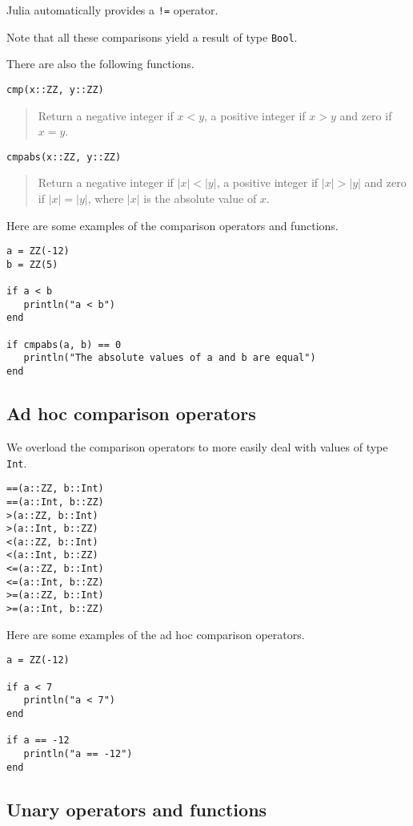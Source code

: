\documentclass[a4paper,10pt]{article}
\newcommand{\code}{\lstinline}
\newcommand{\desc}[1]{\vspace{-3mm}\begin{quote}#1\end{quote}}
\begin{document}
{{{Julia automatically provides a \code{!=} operator.

Note that all these comparisons yield a result of type \code{Bool}.

There are also the following functions.

\begin{lstlisting}
cmp(x::ZZ, y::ZZ)
\end{lstlisting}

\desc{Return a negative integer if $x < y$, a positive integer if $x > y$ and zero if $x = y$.}

\begin{lstlisting}
cmpabs(x::ZZ, y::ZZ)
\end{lstlisting}

\desc{Return a negative integer if $|x| < |y|$, a positive integer if $|x| > |y|$ and zero if 
$|x| = |y|$, where $|x|$ is the absolute value of $x$.}

Here are some examples of the comparison operators and functions.

\begin{lstlisting}
a = ZZ(-12)
b = ZZ(5)

if a < b
   println("a < b")
end

if cmpabs(a, b) == 0
   println("The absolute values of a and b are equal")
end
\end{lstlisting}

\subsection{Ad hoc comparison operators}

We overload the comparison operators to more easily deal with values of type \code{Int}.

\begin{lstlisting}
==(a::ZZ, b::Int)
==(a::Int, b::ZZ)
>(a::ZZ, b::Int)
>(a::Int, b::ZZ)
<(a::ZZ, b::Int)
<(a::Int, b::ZZ)
<=(a::ZZ, b::Int)
<=(a::Int, b::ZZ)
>=(a::ZZ, b::Int)
>=(a::Int, b::ZZ)
\end{lstlisting}

Here are some examples of the ad hoc comparison operators.

\begin{lstlisting}
a = ZZ(-12)

if a < 7
   println("a < 7")
end

if a == -12
   println("a == -12")
end
\end{lstlisting}

\subsection{Unary operators and functions}

}}}
\end{document}
